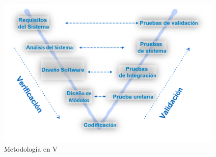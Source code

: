 \\
\begin{figure}[H]
	\centering
	\includegraphics[width=1\textwidth]{Capitulo3/img/vmodel.png}
	\caption{Metodología en V}
	\label{fig:ModeloIncremental}
\end{figure}


